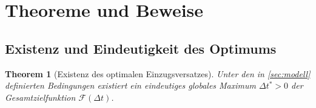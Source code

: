 ﻿\documentclass[12pt, a4paper]{article}
\theoremstyle{plain}
\newtheorem{theorem}{Theorem}[section]
\theoremstyle{definition}
\theoremstyle{remark}
\newcommand{\dt}{\Delta t}
\begin{document}
\section{Theoreme und Beweise}
\label{sec:theoreme}

\subsection{Existenz und Eindeutigkeit des Optimums}

\begin{theorem}[Existenz des optimalen Einzugsversatzes]\label{thm:existenz}
Unter den in \cref{sec:modell} definierten Bedingungen existiert ein eindeutiges
globales Maximum $\dt^* > 0$ der Gesamtzielfunktion $\mathcal{F}(\dt)$.
\end{theorem}
\end{document}
